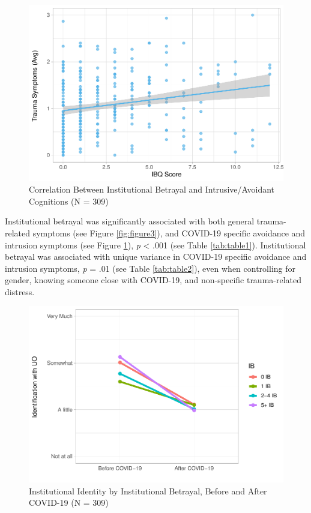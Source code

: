 \documentclass[
  english,
  man, noextraspace]{apa6}
\begin{document}
\begin{figure}[H]

{\centering \includegraphics[width=\textwidth]{papaja_doc_files/figure-latex/figure4-1} 

}

\caption{Correlation Between Institutional Betrayal and Intrusive/Avoidant Cognitions (N = 309) 
}\label{fig:figure4}
\end{figure}

Institutional betrayal was significantly associated with both general trauma-related symptoms (see Figure \ref{fig:figure3}), and COVID-19 specific avoidance and intrusion symptoms (see Figure \ref{fig:figure4}), \emph{p} \textless{} .001 (see Table \ref{tab:table1}). Institutional betrayal was associated with unique variance in COVID-19 specific avoidance and intrusion symptoms, \emph{p} = .01 (see Table \ref{tab:table2}), even when controlling for gender, knowing someone close with COVID-19, and non-specific trauma-related distress.

\begin{figure}[H]

{\centering \includegraphics[width=\textwidth]{papaja_doc_files/figure-latex/figure5-1} 

}

\caption{Institutional Identity by Institutional Betrayal, Before and After COVID-19 (N = 309) 
}\label{fig:figure5}
\end{figure}
\end{document}
